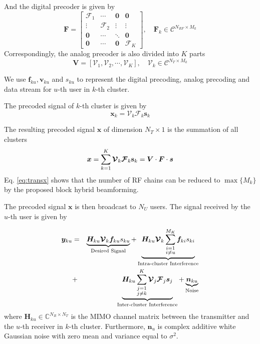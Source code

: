 \documentclass[conference]{IEEEtran}
\begin{document}
And the digital precoder is given by 
\begin{equation}
\bm{F} = 
\begin{bmatrix}
\bm{\mathcal{F}}_1&\cdots & \bm{0}&\bm{0}\\
\vdots & \bm{\mathcal{F}}_2 & \vdots&\vdots \\
\bm{0}&\cdots&\ddots &\bm{0}\\
\bm{0}&\cdots & \bm{0}&\bm{\mathcal{F}}_K
\end{bmatrix}
,\quad
\bm{F}_k \in \mathcal{C}^{N_{RF}\times M_k}
\end{equation}
Correspondingly, the analog precoder is also divided into $K$ parts
\begin{equation}
\bm{V} = \left[\bm{\mathcal{V}}_1, \bm{\mathcal{V}}_2,\cdots, \bm{\mathcal{V}}_{K}\right], \quad \bm{\mathcal{V}}_k\in \mathcal{C}^{N_T\times M_k}
\end{equation}

We use $\bm{f}_{ku}, \bm{v}_{ku}$ and $s_{ku}$ to represent the digital precoding, analog precoding and data stream for $u$-th user in $k$-th cluster.

The precoded signal of $k$-th cluster is given by
\begin{equation}
{\bm x}_{k} = \bm{\mathcal{V}}_k \bm{\mathcal{F}}_k \mathbf{s}_k
\end{equation}

The resulting precoded signal $\bm x$ of dimension $N_{T}\times 1$  is the summation of all clusters 
\begin{equation}{\label{eq:transx}}
{\bm x} = \sum_{k=1}^K \bm{\mathcal{V}}_k \bm{\mathcal{F}}_k \mathbf{s}_k = \bm{V}\cdot \bm{F}\cdot\bm{s}
\end{equation}
Eq. \eqref{eq:transx} shows that the number of RF chains can be reduced to $\max\{M_k\}$ by the proposed block hybrid beamforming.

The precoded signal $\bm x$ is then broadcast to $N_U$ users. The signal received by the $u$-th user is given by

\begin{eqnarray}{\label{eq:rewrite}}
{\bm y}_{ku} &=&\underbrace{\bm{H}_{ku} \bm{\mathcal{V}}_k\bm{f}_{ku}{s}_{ku}}_\text{Desired Signal}+\underbrace{\bm{H}_{ku} \bm{\mathcal{V}}_k\sum_{\substack{i=1 \\ i\neq u}}^{M_K}\bm{f}_{ki}s_{ki}}_\text{Intra-cluster Interference} \nonumber\\
&+& \underbrace{\bm{H}_{ku}\sum_{\substack{j=1\\j\neq k}}^{K}\bm{\mathcal{V}}_j\bm{\mathcal{F}}_j\bm{s}_j}_\text{Inter-cluster Interference}+ \underbrace{\bm{n}_{ku}}_\text{Noise}
\end{eqnarray}
where $\bm{H}_{ku}$$\in\mathbb{C}^{N_R\times N_T}$ is the MIMO channel matrix between the transmitter and the $u$-th receiver in $k$-th cluster\cite{el2014spatially}. Furthermore, $\bm{n}_u$ is complex additive white Gaussian noise with zero mean and variance equal to $\sigma^2$.
\end{document}
